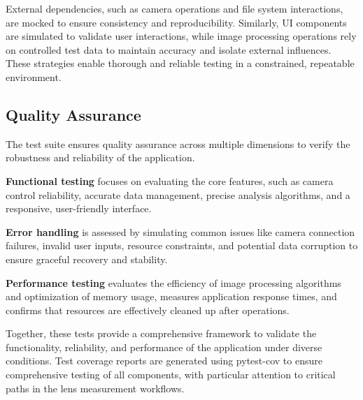 External dependencies, such as camera operations and file system interactions, are mocked to ensure consistency and reproducibility. Similarly, UI components are simulated to validate user interactions, while image processing operations rely on controlled test data to maintain accuracy and isolate external influences. These strategies enable thorough and reliable testing in a constrained, repeatable environment.

\subsection{Quality Assurance}
The test suite ensures quality assurance across multiple dimensions to verify the robustness and reliability of the application. 

\textbf{Functional testing} focuses on evaluating the core features, such as camera control reliability, accurate data management, precise analysis algorithms, and a responsive, user-friendly interface. 

\textbf{Error handling} is assessed by simulating common issues like camera connection failures, invalid user inputs, resource constraints, and potential data corruption  to ensure graceful recovery and stability. 

\textbf{Performance testing} evaluates the efficiency of image processing algorithms and optimization of memory usage, measures application response times, and confirms that resources are effectively cleaned up after operations. 

Together, these tests provide a comprehensive framework to validate the functionality, reliability, and performance of the application under diverse conditions. Test coverage reports are generated using pytest-cov to ensure comprehensive testing of all components, with particular attention to critical paths in the lens measurement workflows.


